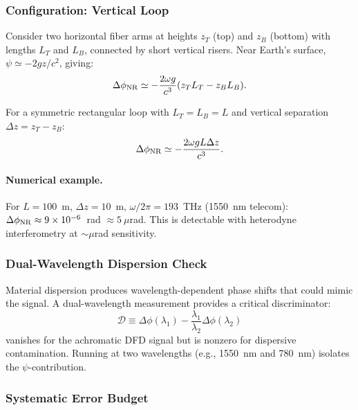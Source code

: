 \subsubsection{Configuration: Vertical Loop}

Consider two horizontal fiber arms at heights $z_T$ (top) and $z_B$ (bottom) 
with lengths $L_T$ and $L_B$, connected by short vertical risers. Near Earth's 
surface, $\psi \simeq -2gz/c^2$, giving:
\begin{equation}\label{eq:fiber-phase}
\Delta\phi_{\rm NR} \simeq -\frac{2\omega g}{c^3}(z_T L_T - z_B L_B).
\end{equation}

For a symmetric rectangular loop with $L_T = L_B = L$ and vertical separation 
$\Delta z = z_T - z_B$:
\begin{equation}\label{eq:fiber-rect}
\Delta\phi_{\rm NR} \simeq -\frac{2\omega g L \Delta z}{c^3}.
\end{equation}

\paragraph{Numerical example.}
For $L = 100$~m, $\Delta z = 10$~m, $\omega/2\pi = 193$~THz (1550~nm telecom):
$\Delta\phi_{\rm NR} \approx 9 \times 10^{-6}$~rad $\approx 5~\mu$rad.
This is detectable with heterodyne interferometry at $\sim\mu$rad sensitivity.

\subsubsection{Dual-Wavelength Dispersion Check}

Material dispersion produces wavelength-dependent phase shifts that could 
mimic the signal. A dual-wavelength measurement provides a critical discriminator:
\begin{equation}\label{eq:dual-lambda}
\mathcal{D} \equiv \Delta\phi(\lambda_1) - \frac{\lambda_1}{\lambda_2}\Delta\phi(\lambda_2)
\end{equation}
vanishes for the achromatic DFD signal but is nonzero for dispersive contamination. 
Running at two wavelengths (e.g., 1550~nm and 780~nm) isolates the $\psi$-contribution.

\subsubsection{Systematic Error Budget}

